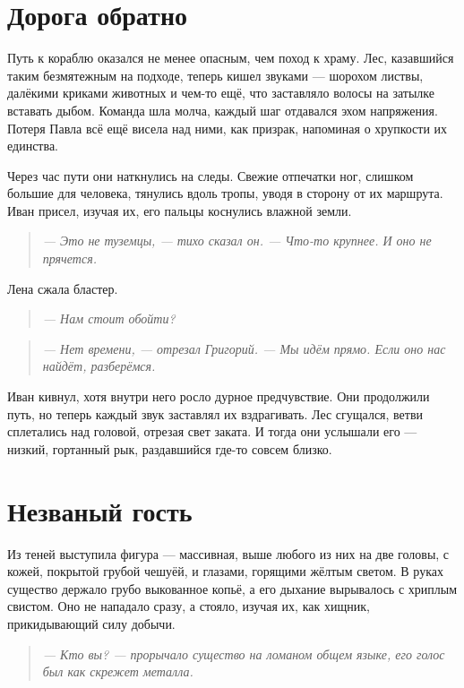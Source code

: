 \documentclass[12pt,a4paper]{book} %
\newenvironment{dialogue}{\begin{quote}\itshape}{\end{quote}}
\begin{document}
\section*{Дорога обратно}

Путь к кораблю оказался не менее опасным, чем поход к храму. Лес, казавшийся таким безмятежным на подходе, теперь кишел звуками --- шорохом листвы, далёкими криками животных и чем-то ещё, что заставляло волосы на затылке вставать дыбом. Команда шла молча, каждый шаг отдавался эхом напряжения. Потеря Павла всё ещё висела над ними, как призрак, напоминая о хрупкости их единства.

Через час пути они наткнулись на следы. Свежие отпечатки ног, слишком большие для человека, тянулись вдоль тропы, уводя в сторону от их маршрута. Иван присел, изучая их, его пальцы коснулись влажной земли.

\begin{dialogue}
--- Это не туземцы, --- тихо сказал он. --- Что-то крупнее. И оно не прячется.
\end{dialogue}

Лена сжала бластер.

\begin{dialogue}
--- Нам стоит обойти?
\end{dialogue}

\begin{dialogue}
--- Нет времени, --- отрезал Григорий. --- Мы идём прямо. Если оно нас найдёт, разберёмся.
\end{dialogue}

Иван кивнул, хотя внутри него росло дурное предчувствие. Они продолжили путь, но теперь каждый звук заставлял их вздрагивать. Лес сгущался, ветви сплетались над головой, отрезая свет заката. И тогда они услышали его --- низкий, гортанный рык, раздавшийся где-то совсем близко.

\section*{Незваный гость}

Из теней выступила фигура --- массивная, выше любого из них на две головы, с кожей, покрытой грубой чешуёй, и глазами, горящими жёлтым светом. В руках существо держало грубо выкованное копьё, а его дыхание вырывалось с хриплым свистом. Оно не нападало сразу, а стояло, изучая их, как хищник, прикидывающий силу добычи.

\begin{dialogue}
--- Кто вы? --- прорычало существо на ломаном общем языке, его голос был как скрежет металла.
\end{dialogue}
\end{document}
